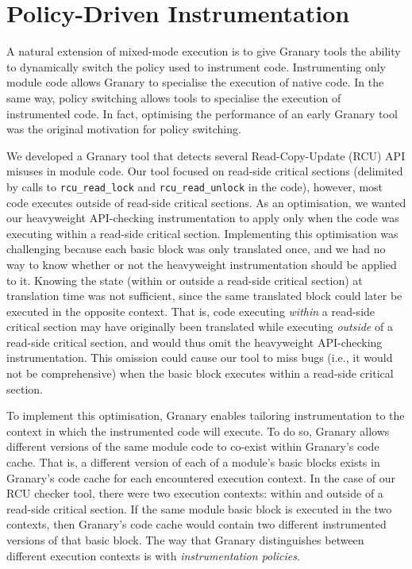 \documentclass[preprint]{sigplanconf}
\begin{document}
\section{Policy-Driven Instrumentation}\label{sec:policies}

A natural extension of mixed-mode execution is to give Granary tools the ability to dynamically switch the policy used to instrument code. Instrumenting only module code allows Granary to specialise the execution of native code. In the same way, policy switching allows tools to specialise the execution of instrumented code. In fact, optimising the performance of an early Granary tool was the original motivation for policy switching.

We developed a Granary tool that detects several Read-Copy-Update (RCU) API misuses in module code. Our tool focused on read-side critical sections (delimited by calls to \texttt{rcu\_read\_lock} and \texttt{rcu\_read\_unlock} in the code), however, most code executes outside of read-side critical sections. As an optimisation, we wanted our heavyweight API-checking instrumentation to apply only when the code was executing within a read-side critical section. Implementing this optimisation was challenging because each basic block was only translated once, and we had no way to know whether or not the heavyweight instrumentation should be applied to it. Knowing the state (within or outside a read-side critical section) at translation time was not sufficient, since the same translated block could later be executed in the opposite context. That is, code executing \emph{within} a read-side critical section may have originally been translated while executing \emph{outside} of a read-side critical section, and would thus omit the heavyweight API-checking instrumentation. This omission could cause our tool to miss bugs (i.e., it would not be comprehensive) when the basic block executes within a read-side critical section.

To implement this optimisation, Granary enables tailoring instrumentation to the context in which the instrumented code will execute. To do so, Granary allows different versions of the same module code to co-exist within Granary's code cache. That is, a different version of each of a module's basic blocks exists in Granary's code cache  for each encountered execution context. In the case of our RCU checker tool, there were two execution contexts: within and outside of a read-side critical section. If the same module basic block is  executed in the two contexts, then Granary's code cache would contain two different instrumented versions of that basic block. The way that Granary distinguishes between different execution contexts is with \emph{instrumentation policies}. 
\end{document}
